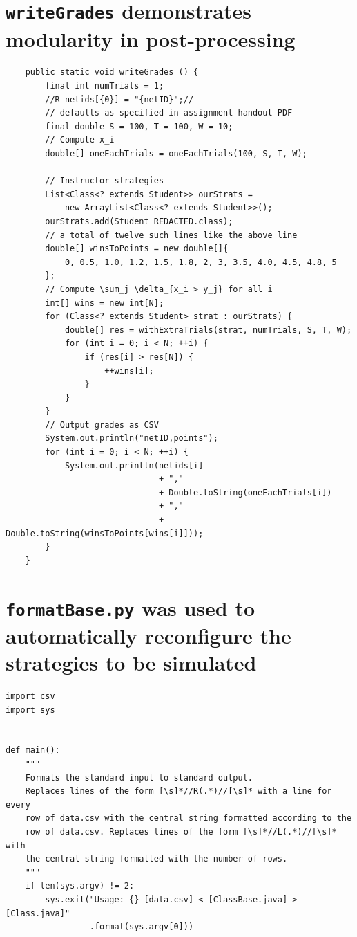 \documentclass[pageno]{jpaper}
\begin{document}
\newpage
\begin{appendices}
  \appendixpage{}
  \section{\texttt{writeGrades} demonstrates modularity in post-processing}\label{appendix:writeGrades}
\begin{verbatim}
    public static void writeGrades () {
        final int numTrials = 1;
        //R netids[{0}] = "{netID}";//
        // defaults as specified in assignment handout PDF
        final double S = 100, T = 100, W = 10;
        // Compute x_i
        double[] oneEachTrials = oneEachTrials(100, S, T, W);

        // Instructor strategies
        List<Class<? extends Student>> ourStrats =
            new ArrayList<Class<? extends Student>>();
        ourStrats.add(Student_REDACTED.class);
        // a total of twelve such lines like the above line
        double[] winsToPoints = new double[]{
            0, 0.5, 1.0, 1.2, 1.5, 1.8, 2, 3, 3.5, 4.0, 4.5, 4.8, 5
        };
        // Compute \sum_j \delta_{x_i > y_j} for all i
        int[] wins = new int[N];
        for (Class<? extends Student> strat : ourStrats) {
            double[] res = withExtraTrials(strat, numTrials, S, T, W);
            for (int i = 0; i < N; ++i) {
                if (res[i] > res[N]) {
                    ++wins[i];
                }
            }
        }
        // Output grades as CSV
        System.out.println("netID,points");
        for (int i = 0; i < N; ++i) {
            System.out.println(netids[i]
                               + ","
                               + Double.toString(oneEachTrials[i])
                               + ","
                               + Double.toString(winsToPoints[wins[i]]));
        }
    }
\end{verbatim}
  \newpage
  \section{\texttt{formatBase.py} was used to automatically reconfigure the strategies to be simulated}\label{appendix:formatBase}
\begin{verbatim}
import csv
import sys


def main():
    """
    Formats the standard input to standard output.
    Replaces lines of the form [\s]*//R(.*)//[\s]* with a line for every
    row of data.csv with the central string formatted according to the
    row of data.csv. Replaces lines of the form [\s]*//L(.*)//[\s]* with
    the central string formatted with the number of rows.
    """
    if len(sys.argv) != 2:
        sys.exit("Usage: {} [data.csv] < [ClassBase.java] > [Class.java]"
                 .format(sys.argv[0]))


\end{verbatim}
\end{appendices}
\end{document}
